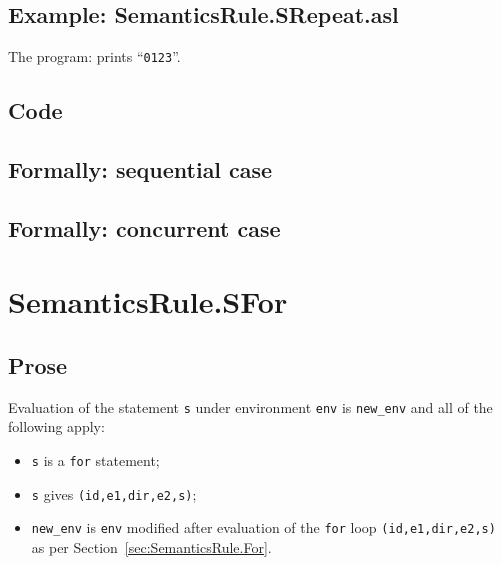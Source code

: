 \documentclass{book}
\begin{document}
    \subsection{Example: SemanticsRule.SRepeat.asl}
    The program:
    prints ``\texttt{0123}''.

  \subsection{Code}

\begin{emptyformal}
  \subsection{Formally: sequential case}

  \subsection{Formally: concurrent case}
\end{emptyformal}


\section{SemanticsRule.SFor \label{sec:SemanticsRule.SFor}}

    \subsection{Prose}
  Evaluation of the statement \texttt{s} under environment \texttt{env} is
\texttt{new\_env} and all of the following apply:
    \begin{itemize}
    \item \texttt{s} is a \texttt{for} statement;
    \item \texttt{s} gives \texttt{(id,e1,dir,e2,s)};
    \item \texttt{new\_env} is \texttt{env} modified after evaluation of the \texttt{for} loop \texttt{(id,e1,dir,e2,s)} as per Section~\ref{sec:SemanticsRule.For}.
    \end{itemize}
\end{document}
